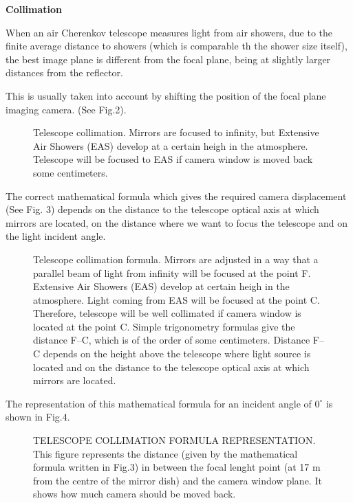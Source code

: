 {\bf Collimation}

When an air Cherenkov telescope measures light from air showers, due
to the finite average distance to showers (which is comparable th the
shower size itself), the best image plane is different from the focal
plane, being at slightly larger distances from the reflector.

This is usually taken into account by shifting the position of the
focal plane imaging camera. (See Fig.2).

\begin{figure}[h]\centering
  \leavevmode \epsfxsize=6cm
  \caption{\tiny{Telescope collimation. Mirrors are focused to 
      infinity, but Extensive Air Showers (EAS) develop at a certain
      heigh in the atmosphere. Telescope will be focused to EAS if
      camera window is moved back some centimeters.}}
\end{figure}


The correct mathematical formula which gives the required camera
displacement (See Fig. 3) depends on the distance to the telescope
optical axis at which mirrors are located, on the distance where we
want to focus the telescope and on the light incident angle.
\begin{figure}[h]\centering
  \leavevmode \epsfxsize=10cm

  \caption{\tiny{Telescope collimation formula. Mirrors are adjusted 
      in a way that a parallel beam of light from infinity will be
      focused at the point F. Extensive Air Showers (EAS) develop at
      certain heigh in the atmosphere. Light coming from EAS will be
      focused at the point C. Therefore, telescope will be well
      collimated if camera window is located at the point C. Simple
      trigonometry formulas give the distance F--C, which is of the
      order of some centimeters. Distance F--C depends on the height
      above the telescope where light source is located and on the
      distance to the telescope optical axis at which mirrors are
      located.}}

\end{figure}


The representation of this mathematical formula for an incident angle
of $0^{\circ}$ is shown in Fig.4.

\begin{figure}[h]\centering
  \leavevmode \epsfxsize=6cm
  \caption{\tiny{TELESCOPE COLLIMATION FORMULA REPRESENTATION. 
      This figure represents the distance (given by the mathematical
      formula written in Fig.3) in between the focal lenght point (at
      17 m from the centre of the mirror dish) and the camera window
      plane. It shows how much camera should be moved back.}}
\end{figure}


